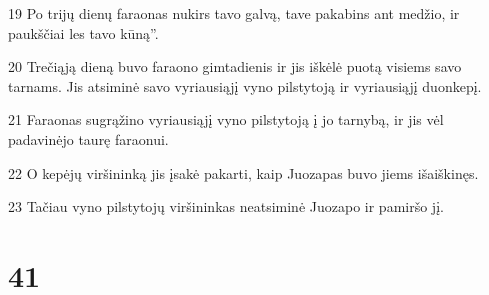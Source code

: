 \par 19 Po trijų dienų faraonas nukirs tavo galvą, tave pakabins ant medžio, ir paukščiai les tavo kūną”. 
\par 20 Trečiąją dieną buvo faraono gimtadienis ir jis iškėlė puotą visiems savo tarnams. Jis atsiminė savo vyriausiąjį vyno pilstytoją ir vyriausiąjį duonkepį. 
\par 21 Faraonas sugrąžino vyriausiąjį vyno pilstytoją į jo tarnybą, ir jis vėl padavinėjo taurę faraonui. 
\par 22 O kepėjų viršininką jis įsakė pakarti, kaip Juozapas buvo jiems išaiškinęs. 
\par 23 Tačiau vyno pilstytojų viršininkas neatsiminė Juozapo ir pamiršo jį.



\chapter{41}


